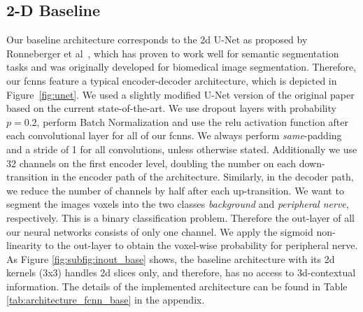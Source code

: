 \subsection{2-D Baseline}
Our baseline architecture corresponds to the \gls{2d} U-Net as proposed by Ronneberger et al~\cite{Ronneberger2015U-Net:Segmentation}, which has proven to work well for semantic segmentation tasks and was originally developed for biomedical image segmentation. Therefore, our \gls{fcnn}s feature a typical encoder-decoder architecture, which is depicted in Figure~\ref{fig:unet}. We used a slightly modified U-Net version of the original paper based on the current state-of-the-art. We use dropout layers \cite{Srivastava2014Dropout:Overfitting} with probability $p = 0.2$, perform Batch Normalization \cite{SergeyIoffe2015BatchNormalization} and use the \gls{relu} activation function after each convolutional layer for all of our \gls{fcnn}s. We always perform \textit{same}-padding and a stride of 1 for all convolutions, unless otherwise stated. Additionally we use 32 channels on the first encoder level, doubling the number on each down-transition in the encoder path of the architecture.
Similarly, in the decoder path, we reduce the number of channels by half after each up-transition. We want to segment the images voxels into the two classes \textit{background} and \textit{peripheral nerve}, respectively. This is a binary classification problem. Therefore the out-layer of all our neural networks consists of only one channel. We apply the sigmoid non-linearity to the out-layer to obtain the voxel-wise probability for peripheral nerve.\\
As Figure \ref{fig:subfig:inout_base} shows, the baseline architecture with its \gls{2d} kernels (3x3) handles \gls{2d} slices only, and therefore, has no access to \gls{3d}-contextual information. The details of the implemented architecture can be found in Table \ref{tab:architecture_fcnn_base} in the appendix.

